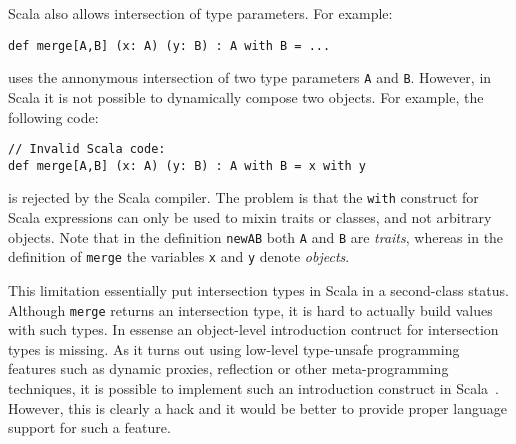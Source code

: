 \noindent Scala also allows intersection of type parameters. For example:
\begin{lstlisting}
def merge[A,B] (x: A) (y: B) : A with B = ...
\end{lstlisting}
uses the annonymous intersection of two type parameters \lstinline{A} and
\lstinline{B}. However, in Scala it is not possible to dynamically
compose two objects. For example, the following code:

\begin{lstlisting}
// Invalid Scala code:
def merge[A,B] (x: A) (y: B) : A with B = x with y
\end{lstlisting}

\noindent is rejected by the Scala compiler. The problem is that the
\lstinline{with} construct for Scala expressions can only be used to
mixin traits or classes, and not arbitrary objects. Note that in the 
definition \lstinline{newAB} both \lstinline{A} and \lstinline{B} are
\emph{traits}, whereas in the definition of \lstinline{merge} the variables 
\lstinline{x} and \lstinline{y} denote \emph{objects}. 

\begin{comment}
A common limitation in those languages, though, is that there is no introduction
construct at the term level for intersection types. In Java and Scala, we cannot
create an instance of class type \lstinline{A & B} with
\begin{lstlisting}
  new A() & B()
\end{lstlisting}
\end{comment}

This limitation essentially put intersection types in Scala in a second-class
status. Although \lstinline{merge} returns an intersection type, it is
hard to actually build values with such types. In essense an
object-level introduction contruct for intersection types is missing.
As it turns out using low-level type-unsafe programming features such
as dynamic proxies, reflection or other meta-programming techniques,
it is possible to implement such an introduction
construct in Scala~\cite{oliveira2013feature,rendel14attributes}. However, this
is clearly a hack and it would be better to provide proper language
support for such a feature.

\begin{comment}
This is in 
contrast, there are term-level introduction construct for function types (with
lambdas) and universal quantification (with big lambdas) in most core
calculi.
\end{comment}

